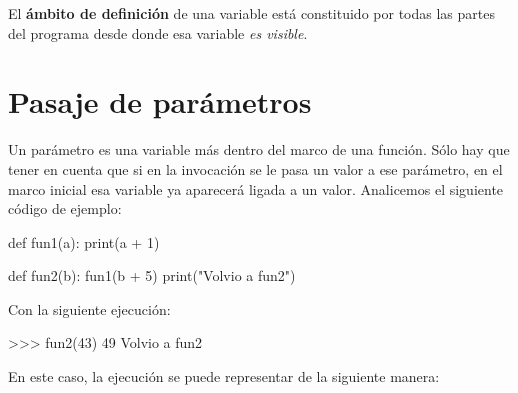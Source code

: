 El {\bf ámbito de definición} de una variable está constituido por todas las
partes del programa desde donde esa variable {\it es visible}.

\section{Pasaje de parámetros}

Un parámetro es una variable más dentro del marco de una función.
Sólo hay que tener en cuenta que si en la invocación se le pasa
un valor a ese parámetro, en el marco inicial esa variable ya aparecerá
ligada a un valor. Analicemos el siguiente código de ejemplo:

\begin{codigo-python-sn}
def fun1(a):
    print(a + 1)

def fun2(b):
    fun1(b + 5)
    print("Volvio a fun2")
\end{codigo-python-sn}

Con la siguiente ejecución:

\begin{codigo-python-sn}
>>> fun2(43)
49
Volvio a fun2
\end{codigo-python-sn}

En este caso, la ejecución se puede representar de la siguiente manera:

